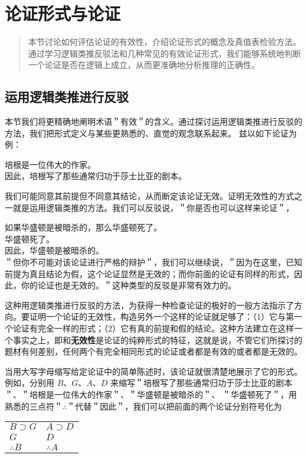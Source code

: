 \section{论证形式与论证}

\begin{quotation}
本节讨论如何评估论证的有效性，介绍论证形式的概念及真值表检验方法。通过学习逻辑类推反驳法和几种常见的有效论证形式，我们能够系统地判断一个论证是否在逻辑上成立，从而更准确地分析推理的正确性。
\end{quotation}

\subsection{运用逻辑类推进行反驳}
本节我们将更精确地阐明术语＂有效＂的含义。通过探讨运用逻辑类推进行反驳的方法，我们把形式定义与某些更熟悉的、直觉的观念联系起来。\cite{copi1980} 兹以如下论证为例：

培根是一位伟大的作家。\\
因此，培根写了那些通常归功于莎士比亚的剧本。

我们可能同意其前提但不同意其结论，从而断定该论证无效。证明无效性的方式之一就是运用逻辑类推的方法。我们可以反驳说，＂你是否也可以这样来论证＂，

如果华盛顿是被暗杀的，那么华盛顿死了。\\
华盛顿死了。\\
因此，华盛顿是被暗杀的。\\
＂但你不可能对该论证进行严格的辩护＂，我们可以继续说，＂因为在这里，已知前提为真且结论为假，这个论证显然是无效的；而你前面的论证有同样的形式，因此，你的论证也是无效的。＂这种类型的反驳是非常有效力的。

这种用逻辑类推进行反驳的方法，为获得一种检查论证的极好的一般方法指示了方向。要证明一个论证的无效性，构造另外一个这样的论证就足够了：（1）它与第一个论证有完全一样的形式；（2）它有真的前提和假的结论。这种方法建立在这样一个事实之上，即和\textbf{无效性}是论证的纯粹形式的特征，这就是说，不管它们所探讨的题材有何差别，任何两个有完全相同形式的论证或者都是有效的或者都是无效的。\cite{jevons1886}

当用大写字母缩写给定论证中的简单陈述时，该论证就很清楚地展示了它的形式。例如，分别用 $B 、 G 、 A 、 D$ 来缩写＂培根写了那些通常归功于莎士比亚的剧本＂、＂培根是一位伟大的作家＂、＂华盛顿是被暗杀的＂、 ＂华盛顿死了＂，用熟悉的三点符＂$\therefore$＂代替＂因此＂，我们可以把前面的两个论证分别符号化为

\begin{center}
\begin{tabular}{ll}
$B \supset G$ & $A \supset D$ \\
$G$ & $D$ \\
$\therefore B$ & $\therefore A$ \\
\end{tabular}
\end{center}

